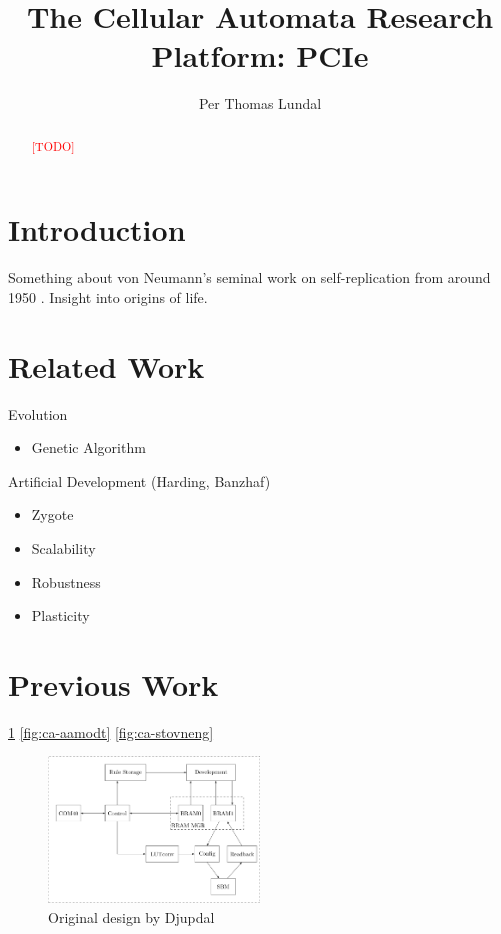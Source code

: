 \documentclass[a4paper]{IEEEtran}
\title{The Cellular Automata Research Platform: PCIe}
\author{Per Thomas Lundal}
\newcommand\TODO{\textcolor{red}{[TODO]}}
\begin{document}
\maketitle

\begin{abstract}

\TODO

\end{abstract}

\section{Introduction}

Something about von Neumann's seminal work on self-replication from around 1950 \cite{neumann1966selfreplication}.
Insight into origins of life.


\section{Related Work}

Evolution
\begin{itemize}
    \item Genetic Algorithm
\end{itemize}

Artificial Development (Harding, Banzhaf)
\begin{itemize}
    \item Zygote
    \item Scalability
    \item Robustness
    \item Plasticity
\end{itemize}

\section{Previous Work}

\ref{fig:ca-djupdal}
\ref{fig:ca-aamodt}
\ref{fig:ca-stovneng}

\cite{djupdal2003sblock}
\cite{aamodt2005sblock}
\cite{stovneng2014sblock}

\begin{figure}[h!]
    \centering
    \includegraphics[width=0.5\textwidth]{figures/ca-djupdal}
    \caption{Original design by Djupdal}
    \label{fig:ca-djupdal}
\end{figure}
\end{document}
